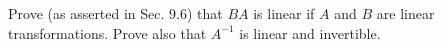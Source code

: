 \begin{exercise}
	Prove (as asserted in Sec. 9.6) that $BA$ is linear if $A$ and $B$ are linear transformations. Prove also that $A^{-1}$ is linear and invertible.
\end{exercise}
